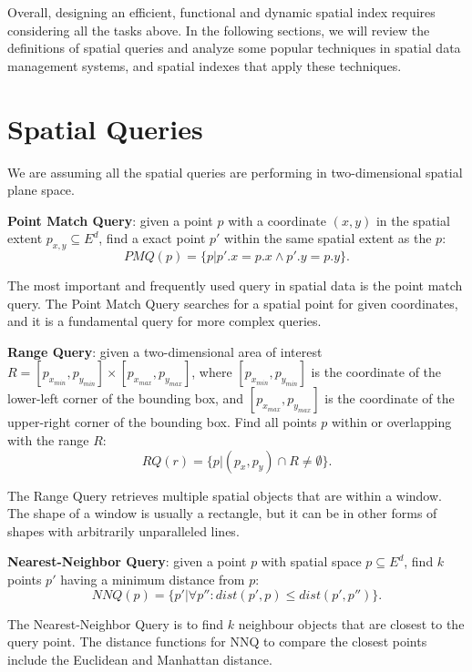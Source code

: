 Overall, designing an efficient, functional and dynamic spatial index requires considering all the tasks above. In the following sections, we will review the definitions of spatial queries and analyze some popular techniques in spatial data management systems, and spatial indexes that apply these techniques. 




\section{Spatial Queries}
We are assuming all the spatial queries are performing in two-dimensional spatial plane space. 

\begin{query}\label{def:pmq}
\textbf{Point Match Query}: given a point $p$ with a coordinate $(x, y)$ in the spatial extent ${p_{x, y}} \subseteq {E^d}$, find a exact point $p'$ within the same spatial extent as the $p$:
\[PMQ(p) = \{p|p'.x = p.x \land p'.y = p.y\}.\]
\end{query}

The most important and frequently used query in spatial data is the point match query. The Point Match Query searches for a spatial point for given coordinates, and it is a fundamental query for more complex queries.

\begin{query}\label{def:rq}
\textbf{Range Query}: given a two-dimensional area of interest $R = [p_{x_{min}}, p_{y_{min}}] \times [p_{x_{max}}, p_{y_{max}}]$, where $[p_{x_{min}}, p_{y_{min}}]$ is the coordinate of the lower-left corner of the bounding box, and $[p_{x_{max}}, p_{y_{max}}]$ is the coordinate of the upper-right corner of the bounding box. Find all points $p$ within or overlapping with the range $R$:
\[RQ(r) = \{p|(p_x, p_y) \cap R \neq \emptyset\}.\]
\end{query}

The Range Query retrieves multiple spatial objects that are within a window. The shape of a window is usually a rectangle, but it can be in other forms of shapes with arbitrarily unparalleled lines.

\begin{query}\label{def:nnq}
\textbf{Nearest-Neighbor Query}: given a point $p$ with spatial space $p\subseteq{E^d}$, find $k$ points $p'$ having a minimum distance from $p$:
\[NNQ(p) = \{p'|\forall p'':dist(p', p) \leq dist(p', p'')\}.\]
\end{query}

The Nearest-Neighbor Query is to find $k$ neighbour objects that are closest to the query point.  The distance functions for NNQ to compare the closest points include the Euclidean and Manhattan distance. 



